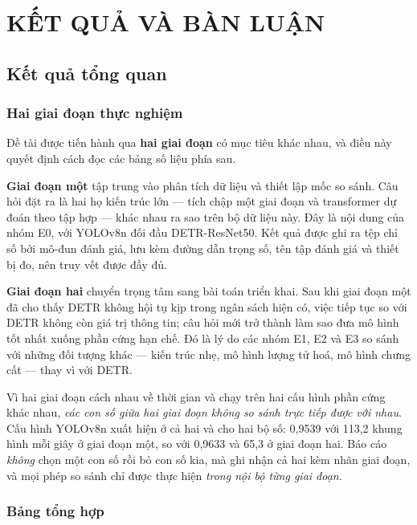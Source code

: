 \chapter{KẾT QUẢ VÀ BÀN LUẬN}
\label{ch:ket_qua}

\section{Kết quả tổng quan}

\subsection{Hai giai đoạn thực nghiệm}
\label{sec:quy_uoc_do}

Đề tài được tiến hành qua \textbf{hai giai đoạn} có mục tiêu khác nhau, và điều này quyết định cách
đọc các bảng số liệu phía sau.

\textbf{Giai đoạn một} tập trung vào phân tích dữ liệu và thiết lập mốc so sánh. Câu hỏi đặt ra là
hai họ kiến trúc lớn --- tích chập một giai đoạn và transformer dự đoán theo tập hợp --- khác nhau
ra sao trên bộ dữ liệu này. Đây là nội dung của nhóm E0, với YOLOv8n đối đầu DETR-ResNet50. Kết quả
được ghi ra tệp chỉ số bởi mô-đun đánh giá, lưu kèm đường dẫn trọng số, tên tập đánh giá và thiết bị
đo, nên truy vết được đầy đủ.

\textbf{Giai đoạn hai} chuyển trọng tâm sang bài toán triển khai. Sau khi giai đoạn một đã cho thấy
DETR không hội tụ kịp trong ngân sách hiện có, việc tiếp tục so với DETR không còn giá trị thông
tin; câu hỏi mới trở thành làm sao đưa mô hình tốt nhất xuống phần cứng hạn chế. Đó là lý do các
nhóm E1, E2 và E3 so sánh với những đối tượng khác --- kiến trúc nhẹ, mô hình lượng tử hoá, mô hình
chưng cất --- thay vì với DETR.

Vì hai giai đoạn cách nhau về thời gian và chạy trên hai cấu hình phần cứng khác nhau, \emph{các con
số giữa hai giai đoạn không so sánh trực tiếp được với nhau}. Cấu hình YOLOv8n xuất hiện ở cả hai và
cho hai bộ số: 0,9539 với 113,2 khung hình mỗi giây ở giai đoạn một, so với 0,9633 và 65,3 ở giai
đoạn hai. Báo cáo \emph{không} chọn một con số rồi bỏ con số kia, mà ghi nhận cả hai kèm nhãn giai
đoạn, và mọi phép so sánh chỉ được thực hiện \emph{trong nội bộ từng giai đoạn}.

\subsection{Bảng tổng hợp}

